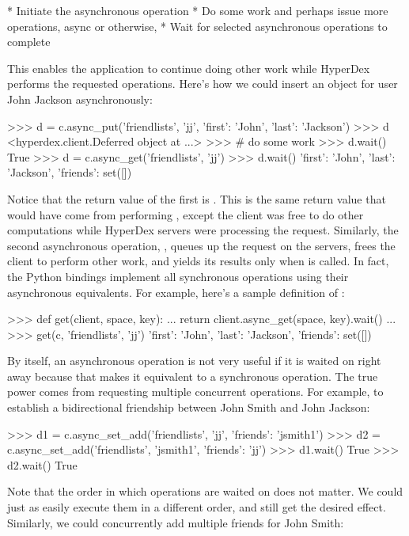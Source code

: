  * Initiate the asynchronous operation
 * Do some work and perhaps issue more operations, async or otherwise,
 * Wait for selected asynchronous operations to complete

This enables the application to continue doing other work while HyperDex
performs the requested operations.  Here's how we could insert an object for
user John Jackson asynchronously:

\begin{pythoncode}
>>> d = c.async_put('friendlists', 'jj', {'first': 'John', 'last': 'Jackson'})
>>> d
<hyperdex.client.Deferred object at ...>
>>> # do some work
>>> d.wait()
True
>>> d = c.async_get('friendlists', 'jj')
>>> d.wait()
{'first': 'John', 'last': 'Jackson', 'friends': set([])}
\end{pythoncode}

Notice that the return value of the first  is .  This
is the same return value that would have come from performing ,
except the client was free to do other computations while HyperDex servers were
processing the  request.  Similarly, the second asynchronous
operation, , queues up the request on the servers, frees the
client to perform other work, and yields its results only when  is
called.  In fact, the Python bindings implement all synchronous operations using
their asynchronous equivalents.  For example, here's a sample definition of
:

\begin{pythoncode}
>>> def get(client, space, key):
...     return client.async_get(space, key).wait()
...
>>> get(c, 'friendlists', 'jj')
{'first': 'John', 'last': 'Jackson', 'friends': set([])}
\end{pythoncode}

By itself, an asynchronous operation is not very useful if it is waited on right
away because that makes it equivalent to a synchronous operation.  The true
power comes from requesting multiple concurrent operations.  For example, to
establish a bidirectional friendship between John Smith and John Jackson:

\begin{pythoncode}
>>> d1 = c.async_set_add('friendlists', 'jj', {'friends': 'jsmith1'})
>>> d2 = c.async_set_add('friendlists', 'jsmith1', {'friends': 'jj'})
>>> d1.wait()
True
>>> d2.wait()
True
\end{pythoncode}

Note that the order in which operations are waited on does not matter.  We could
just as easily execute them in a different order, and still get the desired
effect.  Similarly, we could concurrently add multiple friends for John Smith:

